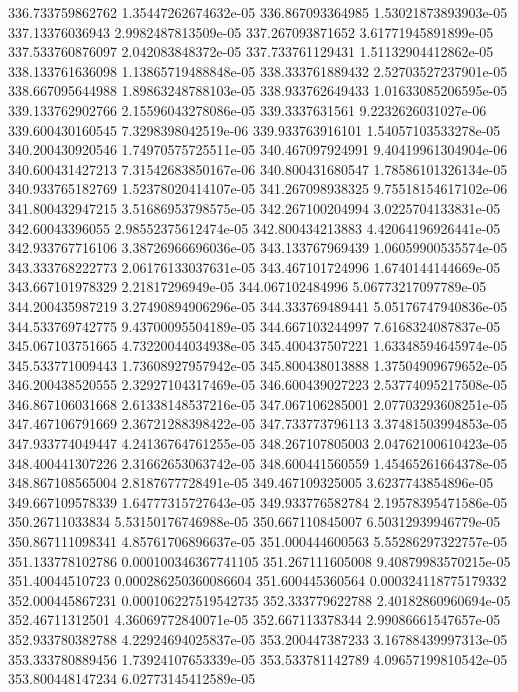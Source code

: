 {336.733759862762 1.35447262674632e-05
336.867093364985 1.53021873893903e-05
337.13376036943 2.9982487813509e-05
337.267093871652 3.61771945891899e-05
337.533760876097 2.042083848372e-05
337.733761129431 1.51132904412862e-05
338.133761636098 1.13865719488848e-05
338.333761889432 2.52703527237901e-05
338.667095644988 1.89863248788103e-05
338.933762649433 1.01633085206595e-05
339.133762902766 2.15596043278086e-05
339.3337631561 9.2232626031027e-06
339.600430160545 7.3298398042519e-06
339.933763916101 1.54057103533278e-05
340.200430920546 1.74970575725511e-05
340.467097924991 9.40419961304904e-06
340.600431427213 7.31542683850167e-06
340.800431680547 1.78586101326134e-05
340.933765182769 1.52378020414107e-05
341.267098938325 9.75518154617102e-06
341.800432947215 3.51686953798575e-05
342.267100204994 3.0225704133831e-05
342.60043396055 2.98552375612474e-05
342.800434213883 4.42064196926441e-05
342.933767716106 3.38726966696036e-05
343.133767969439 1.06059900535574e-05
343.333768222773 2.06176133037631e-05
343.467101724996 1.6740144144669e-05
343.667101978329 2.21817296949e-05
344.067102484996 5.06773217097789e-05
344.200435987219 3.27490894906296e-05
344.333769489441 5.05176747940836e-05
344.533769742775 9.43700095504189e-05
344.667103244997 7.6168324087837e-05
345.067103751665 4.73220044034938e-05
345.400437507221 1.63348594645974e-05
345.533771009443 1.73608927957942e-05
345.800438013888 1.37504909679652e-05
346.200438520555 2.32927104317469e-05
346.600439027223 2.53774095217508e-05
346.867106031668 2.61338148537216e-05
347.067106285001 2.07703293608251e-05
347.467106791669 2.36721288398422e-05
347.733773796113 3.37481503994853e-05
347.933774049447 4.24136764761255e-05
348.267107805003 2.04762100610423e-05
348.400441307226 2.31662653063742e-05
348.600441560559 1.45465261664378e-05
348.867108565004 2.8187677728491e-05
349.467109325005 3.6237743854896e-05
349.667109578339 1.64777315727643e-05
349.933776582784 2.19578395471586e-05
350.26711033834 5.53150176746988e-05
350.667110845007 6.50312939946779e-05
350.867111098341 4.85761706896637e-05
351.000444600563 5.55286297322757e-05
351.133778102786 0.000100346367741105
351.267111605008 9.40879983570215e-05
351.40044510723 0.000286250360086604
351.600445360564 0.000324118775179332
352.000445867231 0.000106227519542735
352.333779622788 2.40182860960694e-05
352.46711312501 4.36069772840071e-05
352.667113378344 2.99086661547657e-05
352.933780382788 4.22924694025837e-05
353.200447387233 3.16788439997313e-05
353.333780889456 1.73924107653339e-05
353.533781142789 4.09657199810542e-05
353.800448147234 6.02773145412589e-05
}
